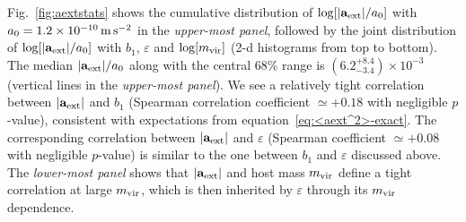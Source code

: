 \documentclass[usenatbib]{mnras}
\newcommand{\aext}{\ensuremath{\mathbf{a}_{\rm ext}}}
\newcommand{\msq}{\ensuremath{{\rm \,m\,s}^{-2}}}
\newcommand{\eqn}[1]{equation~\eqref{#1}}
\begin{document}
Fig.~\ref{fig:aextstats} shows the cumulative distribution of $\log[|\aext|/a_0]$ with $a_0=1.2\times10^{-10}\msq$ in the \emph{upper-most panel}, followed by the joint distribution of $\log[|\aext|/a_0]$ with $b_1$, $\varepsilon$ and $\log[m_{\rm vir}]$ (2-d histograms from top to bottom). The median $|\aext|/a_0$ along with the central $68\%$ range is $(6.2^{+8.4}_{-3.4})\times10^{-3}$ (vertical lines in the \emph{upper-most panel}). We see a relatively tight correlation between $|\aext|$ and $b_1$ (Spearman correlation coefficient $\simeq+0.18$ with negligible $p$-value), consistent with expectations from \eqn{eq:<aext^2>-exact}. The corresponding correlation between $|\aext|$ and $\varepsilon$ (Spearman coefficient $\simeq+0.08$ with negligible $p$-value) is similar to the one between $b_1$ and $\varepsilon$ discussed above. The \emph{lower-most panel} shows that $|\aext|$ and host mass $m_{\rm vir}$ define a tight correlation at large $m_{\rm vir}$, which is then inherited by $\varepsilon$ through its $m_{\rm vir}$ dependence.
\end{document}
